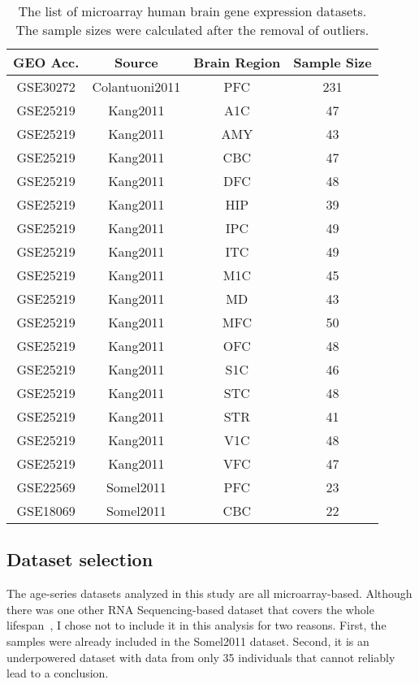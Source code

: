 \begin{table}[ht]
\centering
\caption{The list of microarray human brain gene expression datasets. The sample sizes were calculated after the removal of outliers.}\label{table:table1}
\begin{tabular}{|c c c c|}
 \hline
 \textbf{GEO Acc.} & \textbf{Source} & \textbf{Brain Region} & \textbf{Sample Size} \\ [0.5ex] 
 \hline\hline
 GSE30272 & Colantuoni2011 & PFC & 231 \\ 
 \hline
 GSE25219 & Kang2011 & A1C & 47 \\
 \hline
 GSE25219 & Kang2011 & AMY & 43 \\
 \hline
 GSE25219 & Kang2011 & CBC & 47 \\
 \hline
 GSE25219 & Kang2011 & DFC & 48 \\
 \hline
 GSE25219 & Kang2011 & HIP & 39 \\
 \hline
 GSE25219 & Kang2011 & IPC & 49 \\
 \hline
 GSE25219 & Kang2011 & ITC & 49 \\
 \hline
 GSE25219 & Kang2011 & M1C & 45 \\
 \hline
 GSE25219 & Kang2011 & MD & 43 \\
 \hline
 GSE25219 & Kang2011 & MFC & 50 \\
 \hline
 GSE25219 & Kang2011 & OFC & 48 \\
 \hline
 GSE25219 & Kang2011 & S1C & 46 \\
 \hline
 GSE25219 & Kang2011 & STC & 48 \\
 \hline
 GSE25219 & Kang2011 & STR & 41 \\
 \hline
 GSE25219 & Kang2011 & V1C & 48 \\
 \hline
 GSE25219 & Kang2011 & VFC & 47 \\
 \hline
 GSE22569 & Somel2011 & PFC & 23 \\
 \hline
 GSE18069 & Somel2011 & CBC & 22 \\
\hline
\end{tabular}
\end{table}

\subsection{Dataset selection}
The age-series datasets analyzed in this study are all microarray-based. 
Although there was one other RNA Sequencing-based dataset that covers the whole lifespan~\cite{Mazin2013}, I chose not to include it in this analysis for two reasons.
First, the samples were already included in the Somel2011 dataset. 
Second, it is an underpowered dataset with data from only 35 individuals that cannot reliably lead to a conclusion.

